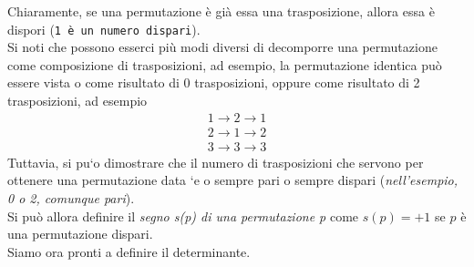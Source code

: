 Chiaramente, se una permutazione è già essa una trasposizione, allora essa è dispori ({\tt 1 è un numero dispari}).\\
Si noti che possono esserci più modi diversi di decomporre una permutazione come composizione di trasposizioni, ad esempio, la permutazione identica può essere vista o come risultato di 0 trasposizioni, oppure come risultato di 2 trasposizioni, ad esempio
\begin{equation*}
  \begin{matrix}
    1 \to 2 \to 1\\
    2 \to 1 \to 2\\
    3 \to 3 \to 3
  \end{matrix}
\end{equation*}
Tuttavia, si pu`o dimostrare che il numero di trasposizioni che servono per ottenere una permutazione data `e o sempre pari o sempre dispari ({\it nell’esempio, 0 o 2, comunque pari}).\\
Si può allora definire il \textit{segno s(p) di una permutazione p} come $s(p)=+1$ se $p$ è una permutazione dispari.\\
Siamo ora pronti a definire il determinante.
